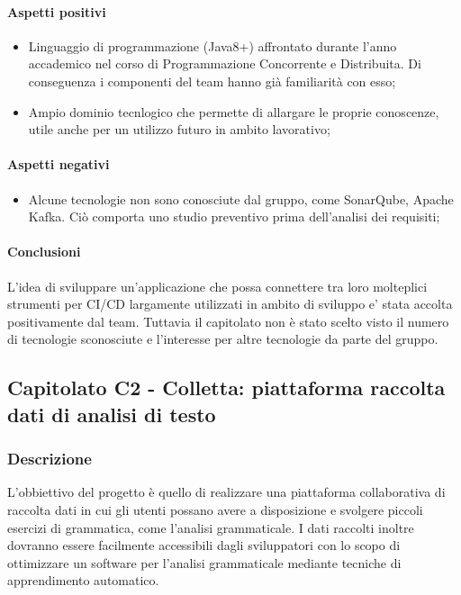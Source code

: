 			\paragraph{Aspetti positivi} 
				\begin{itemize}
				\item {Linguaggio di programmazione (Java8+) affrontato durante l'anno accademico nel corso di Programmazione Concorrente e Distribuita. Di conseguenza i componenti del team hanno già familiarità con esso;}
				\item{Ampio dominio tecnlogico che permette di allargare le proprie conoscenze, utile anche per un utilizzo futuro in ambito lavorativo;}
			\end{itemize}
			\paragraph{Aspetti negativi}
			\begin{itemize}
				\item {Alcune tecnologie non sono conosciute dal gruppo, come SonarQube, Apache Kafka. Ciò comporta uno studio preventivo prima dell'analisi dei requisiti;}
			\end{itemize} 
			\paragraph{Conclusioni}
			L'idea di sviluppare un'applicazione che possa connettere tra loro molteplici strumenti per CI/CD largamente utilizzati in ambito di sviluppo e' stata accolta positivamente dal team. Tuttavia il capitolato non è stato scelto visto il numero di tecnologie sconosciute e l'interesse per altre tecnologie da parte del gruppo.
			
	\subsection{Capitolato C2 - Colletta: piattaforma raccolta dati di analisi di testo}
	\subsubsection{Descrizione}
	L'obbiettivo del progetto è quello di realizzare una piattaforma collaborativa di raccolta dati in cui gli utenti possano avere a disposizione e svolgere piccoli esercizi di grammatica, come l'analisi grammaticale.
	I dati raccolti inoltre dovranno essere facilmente accessibili dagli sviluppatori con lo scopo di ottimizzare un software per l'analisi grammaticale mediante tecniche di apprendimento automatico.   
